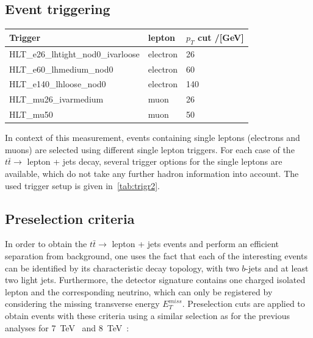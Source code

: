  
\clearpage
 \subsection{Event triggering}

 

 \begin{center}
 	\label{tab:trigr2}
 	
 	
 	
 	\vspace{0.3cm}	
 	
 	
 	\begin{tabular}{>{}m{7.0cm}>{}m{3.0cm}>{}m{3.0cm}} \toprule
 			Trigger&  lepton&$p_T$ cut /[GeV]\\
 			\midrule
 		
 		HLT\_e26\_lhtight\_nod0\_ivarloose& electron&  26\\
 		HLT\_e60\_lhmedium\_nod0  & electron&  60 \\
 		HLT\_e140\_lhloose\_nod0& electron &140\\
		HLT\_mu26\_ivarmedium & muon & 26\\
		HLT\_mu50 & muon & 50\\
 	

 		
 		\bottomrule
 	\end{tabular}
 	
 \end{center}

  In context of this measurement, events containing single leptons (electrons and muons) are selected using different single lepton triggers.
 For each case of the $t\bar{t} \rightarrow$ lepton + jets decay, several  trigger options for the single leptons are available, which do not take any further hadron information into account. The used trigger setup is given in~\cref{tab:trigr2}.
 
 
 
 
 
 
 
\subsection{Preselection criteria} 
In order to obtain the $t\bar{t} \rightarrow$ lepton + jets events and perform an efficient separation from background, one uses the fact that each of the interesting events can be identified by its characteristic decay topology, with  two $b$-jets and at least two light jets. Furthermore, the detector signature contains one charged isolated lepton and the corresponding neutrino, which can only be registered by considering the missing transverse energy $E^{miss}_T$. Preselection cuts are applied to obtain events with these criteria using a similar selection as for the previous analyses for 7~TeV~\cite{Aad:2015nba} and 8~TeV~\cite{ATLAS-CONF-2017-071}:




